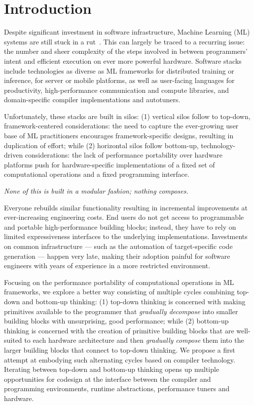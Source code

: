 \section{Introduction}
Despite significant investment in software infrastructure, Machine Learning (ML) systems are still stuck in a rut~\cite{ml_rut}.
This can largely be traced to a recurring issue: the number and sheer complexity of the steps involved in between programmers' intent and efficient execution on ever more powerful hardware.
Software stacks include technologies as diverse as ML frameworks for distributed training or inference, for server or mobile platforms, as well as user-facing languages for productivity, high-performance communication and compute libraries, and domain-specific compiler implementations and autotuners.

Unfortunately, these stacks are built in silos:
(1) vertical silos follow to top-down, framework-centered considerations: the need to capture the ever-growing user base of ML practitioners encourages framework-specific designs, resulting in duplication of effort; while
(2) horizontal silos follow bottom-up, technology-driven considerations: the lack of performance portability over hardware platforms push for hardware-specific implementations of a fixed set of computational operations and a fixed programming interface.

\emph{None of this is built in a modular fashion; nothing composes.}

Everyone rebuilds similar functionality resulting in incremental improvements at ever-increasing engineering costs. End users do not get access to programmable and portable high-performance building blocks; instead, they have to rely on limited expressiveness interfaces to the underlying implementations. Investments on common infrastructure --- such as the automation of target-specific code generation --- happen very late, making their adoption painful for software engineers with years of experience in a more restricted environment.

Focusing on the performance portability of computational operations in ML frameworks, we explore a better way consisting of multiple cycles combining top-down and bottom-up thinking:
(1) top-down thinking is concerned with making primitives available to the programmer that \emph{gradually decompose} into smaller building blocks with unsurprising, good performance; while
(2) bottom-up thinking is concerned with the creation of primitive building blocks that are well-suited to each hardware architecture and then \emph{gradually compose} them into the larger building blocks that connect to top-down thinking.
We propose a first attempt at embodying such alternating cycles based on compiler technology.
Iterating between top-down and bottom-up thinking opens up multiple opportunities for codesign at the interface between the compiler and programming environments, runtime abstractions, performance tuners and hardware.

